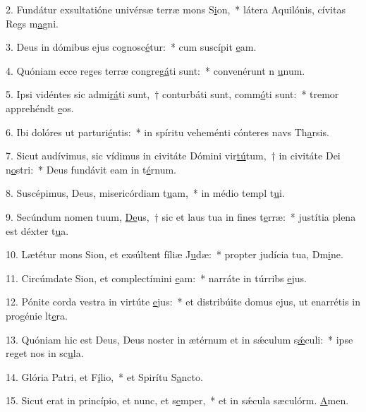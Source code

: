 2. Fundátur exsultatióne univérsæ terræ mons S\uline{i}on,~* látera Aquilónis, cívitas Regs m\uline{a}gni.\par 
3. Deus in dómibus ejus cognosc\uline{é}tur:~* cum suscípit \uline{e}am.\par 
4. Quóniam ecce reges terræ congreg\uline{á}ti sunt:~* convenérunt n \uline{u}num.\par 
5. Ipsi vidéntes sic admi\uline{rá}ti sunt,~† conturbáti sunt, comm\uline{ó}ti sunt:~* tremor apprehéndt \uline{e}os.\par 
6. Ibi dolóres ut parturi\uline{é}ntis:~* in spíritu veheménti cónteres navs Th\uline{a}rsis.\par 
7. Sicut audívimus, sic vídimus in civitáte Dómini vir\uline{tú}tum,~† in civitáte Dei n\uline{o}stri:~* Deus fundávit eam in t\uline{é}rnum.\par 
8. Suscépimus, Deus, misericórdiam t\uline{u}am,~* in médio templ t\uline{u}i.\par 
9. Secúndum nomen tuum, \uline{De}us,~† sic et laus tua in fines t\uline{e}rræ:~* justítia plena est déxter t\uline{u}a.\par 
10. Lætétur mons Sion, et exsúltent fíliæ J\uline{u}dæ:~* propter judícia tua, Dm\uline{i}ne.\par 
11. Circúmdate Sion, et complectímini \uline{e}am:~* narráte in túrribs \uline{e}jus.\par 
12. Pónite corda vestra in virtúte \uline{e}jus:~* et distribúite domus ejus, ut enarrétis in progénie lt\uline{e}ra.\par 
13. Quóniam hic est Deus, Deus noster in ætérnum et in sǽculum s\uline{ǽ}culi:~* ipse reget nos in sc\uline{u}la.\par 
14. Glória Patri, et F\uline{í}lio,~* et Spirítu S\uline{a}ncto.\par 
15. Sicut erat in princípio, et nunc, et s\uline{e}mper,~* et in sǽcula sæculórm. \uline{A}men.\par 
